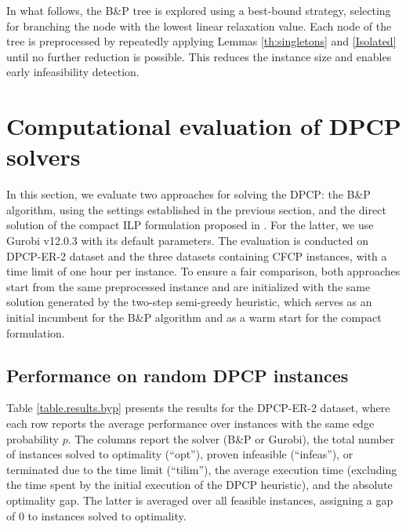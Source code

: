 \documentclass[preprint, 11pt, authoryear]{elsarticle}
\newcommand{\PP}{{\mathcal P}}
\newcommand{\QQ}{{\mathcal Q}}
\begin{document}
In what follows, the B\&P tree is explored using a best-bound strategy, selecting for branching the node with the lowest linear relaxation value.
Each node of the tree is preprocessed by  repeatedly applying Lemmas \ref{th:singletons} and \ref{Isolated} until no further reduction is possible. This reduces the instance size and enables early infeasibility detection.


\section{Computational evaluation of DPCP solvers} \label{sec:computationalresults}

In this section, we evaluate two approaches for solving the DPCP: the B\&P algorithm, using the settings established in the previous section, and the direct solution of the compact ILP formulation proposed in \cite{LucciEtAl2025}.
For the latter, we use Gurobi v12.0.3 with its default parameters. 
The evaluation is conducted on  DPCP-ER-2 dataset and the three datasets containing CFCP instances, with a time limit of one hour per instance.
To ensure a fair comparison, both approaches start from the same preprocessed instance and are initialized with the same solution generated by the two-step semi-greedy heuristic, which serves as an initial incumbent for the B\&P algorithm and as a warm start for the compact formulation.

\subsection{Performance on random DPCP instances}

Table \ref{table.results.byp} presents the results for the DPCP-ER-2 dataset, where each row reports the average performance over instances with the same edge probability $p$.
The columns report the solver (B\&P or Gurobi), the total number of instances solved to optimality (``opt''), proven infeasible (``infeas''), or terminated due to the time limit (``tilim''), the average execution time (excluding the time spent by the initial execution of the DPCP heuristic), and the absolute optimality gap.
The latter is averaged over all feasible instances, assigning a gap of 0 to instances solved to optimality.
\end{document}
